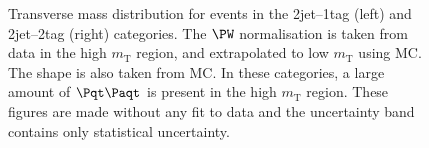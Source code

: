 \begin{figure}
\begin{center}

\end{center}
\caption[Transverse mass distribution for events in the 2jet--1tag (left) and
2jet--2tag (right) categories.]{
Transverse mass distribution for events in the 2jet--1tag (left) and
2jet--2tag (right) categories. The $\PW$ normalisation is taken from data in the high
$m_{\text{T}}$ region, and extrapolated to low $m_{\text{T}}$ using \ac{MC}. The
shape is also taken from \ac{MC}. In these categories, a large amount of
$\ttbar$ is present in the high $m_{\text{T}}$ region. These figures are made without any
fit to data and the uncertainty band contains only statistical uncertainty.}
\label{fig:2jet1tag2jet2tagmt}
\end{figure}


